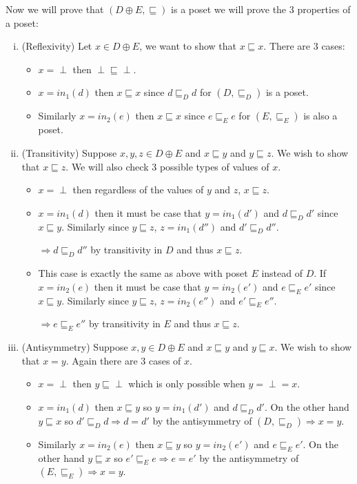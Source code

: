 \begin{enumerate}[(a)]
Now we will prove that $(D \oplus E, \sqsubseteq)$ is a poset we will prove the 3 properties of a poset:
\begin{enumerate}[(i)]
\item (Reflexivity) Let $x \in D \oplus E$, we want to show that $x \sqsubseteq x$. There are 3 cases:
  \begin{itemize}
  \item $x = \perp$ then $\perp \sqsubseteq \perp$.
  \item $x = in_1(d)$ then $x \sqsubseteq x$ since $d \sqsubseteq_D d$ for $(D, \sqsubseteq_D)$ is a poset.
  \item Similarly $x = in_2(e)$ then $x \sqsubseteq x$ since $e \sqsubseteq_E e$ for $(E, \sqsubseteq_E)$ is also a poset.
  \end{itemize}
\item (Transitivity) Suppose $x, y, z \in D \oplus E$ and $x \sqsubseteq y$ and $y \sqsubseteq z$. We wish to show that $x \sqsubseteq z$. We will also check $3$ possible types of values of $x$.
  \begin{itemize}
  \item $x = \perp$ then regardless of the values of $y$ and $z$, $x \sqsubseteq z$.
  \item $x = in_1(d)$ then it must be case that $y = in_1(d')$ and $d \sqsubseteq_D d'$ since $x \sqsubseteq y$. Similarly since $y \sqsubseteq z$, $z = in_1(d'')$ and $d' \sqsubseteq_D d''$.

  $\Rightarrow d \sqsubseteq_D d''$ by transitivity in $D$ and thus $x \sqsubseteq z$.
  \item This case is exactly the same as above with poset $E$ instead of $D$. If $x = in_2(e)$ then it must be case that $y = in_2(e')$ and $e \sqsubseteq_E e'$ since $x \sqsubseteq y$. Similarly since $y \sqsubseteq z$, $z = in_2(e'')$ and $e' \sqsubseteq_E e''$.

  $\Rightarrow e \sqsubseteq_E e''$ by transitivity in $E$ and thus $x \sqsubseteq z$.
  \end{itemize}
\item (Antisymmetry) Suppose $x, y\in D \oplus E$ and $x \sqsubseteq y$ and $y \sqsubseteq x$. We wish to show that $x = y$. Again there are $3$ cases of $x$.
  \begin{itemize}
  \item $x = \perp$ then $y \sqsubseteq \perp$ which is only possible when $y = \perp = x$.
  \item $x = in_1(d)$ then $x \sqsubseteq y$ so $y = in_1(d')$ and $d \sqsubseteq_D d'$. On the other hand $y \sqsubseteq x$ so $d' \sqsubseteq_D d \Rightarrow d = d'$ by the antisymmetry of $(D, \sqsubseteq_D) \Rightarrow x = y$.
  \item Similarly $x = in_2(e)$ then $x \sqsubseteq y$ so $y = in_2(e')$ and $e \sqsubseteq_E e'$. On the other hand $y \sqsubseteq x$ so $e' \sqsubseteq_E e \Rightarrow e = e'$ by the antisymmetry of $(E, \sqsubseteq_E) \Rightarrow x = y$.
  \end{itemize}
\end{enumerate} 


\end{enumerate}
